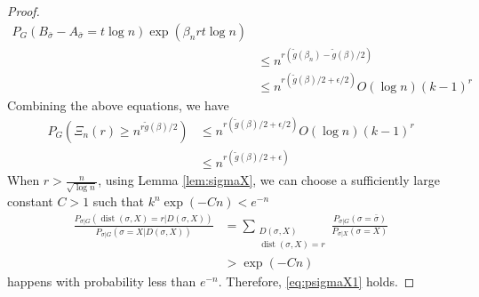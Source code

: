 \documentclass[journal]{IEEEtran}
\newcommand{\1}{\mathbbm{1}}
\DeclareMathOperator{\dist}{dist}
\begin{document}
\begin{proof}
\begin{align*}
P_G(B_{\bar{\sigma}} -A_{\bar{\sigma}}=t\log n)\exp(\beta_n rt \log n) \\
& \leq  n^{r(\tilde{g}(\beta_n) - \tilde{g}(\beta)/2)}\\
& \leq  n^{r(\tilde{g}(\beta)/2 + \epsilon/2)} O(\log n) (k-1)^r
\end{align*}
Combining the above equations, we have
\begin{align*}
P_{G}(\Xi_n(r) \geq n^{r \tilde{g}(\beta) /2}) &\leq  n^{r(\tilde{g}(\beta)/2 + \epsilon/2)} O(\log n) (k-1)^r\\
&\leq n^{r(\tilde{g}(\beta)/2 + \epsilon)}
\end{align*}
When $r>\frac{n}{\sqrt{\log n}}$, using Lemma \ref{lem:sigmaX}, we can choose a sufficiently large constant $C>1$
such that $k^n\exp(-Cn) < e^{-n}$
\begin{align*}
\frac{P_{\sigma|G}(\dist(\sigma, X)=r | D(\sigma, X))}
{P_{\sigma|G}(\sigma=X | D(\sigma, X))} &= \sum_{\substack{D(\sigma, X) \\ \dist(\sigma, X)=r}} \frac{P_{\sigma | G}(\sigma = \bar{\sigma}) }{P_{\sigma | X}(\sigma = X)} \\
&> \exp(-Cn)
\end{align*}
happens with probability less than $e^{-n}$. Therefore, \eqref{eq:psigmaX1} holds.
\end{proof}
\end{document}
